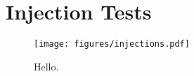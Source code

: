 \documentclass[]{emulateapj}
\begin{document}
\section{Injection Tests}
\label{sec:inj}

\begin{figure}[ht]
  \begin{center}
      \texttt{[image: figures/injections.pdf]}
       \caption{Hello.}
     \label{fig:injections}
  \end{center}
\end{figure}

\clearpage


\end{document}
